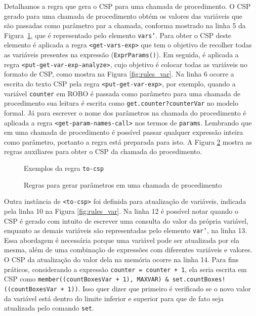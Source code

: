 Detalhamos a regra que gera o CSP para uma chamada de procedimento. O CSP gerado para uma chamada de procedimento 
obtém os valores das variáveis que são passadas como parâmetro par a chamada, conforma mostrado na linha 5 da Figura~\ref{fig:to_csp}, que é representado pelo elemento \texttt{vars'}. Para obter o CSP deste elemento é aplicada a regra \texttt{<get-vars-exp>} que tem o objetivo de recolher todas as variáveis presentes na expressão (\texttt{ExprParams()}). Em seguida, é aplicada a regra \texttt{<put-get-var-exp-analyze>}, cujo objetivo é colocar todas as variáveis no formato de CSP, como mostra na Figura \ref{fig:rules_var}. Na linha 6 ocorre a escrita do texto CSP pela regra \texttt{<put-get-var-exp>}, por exemplo, quando a variável \texttt{counter} em ROBO é passada como parâmetro para uma chamada de procedimento sua leitura é escrita como \texttt{get.counter?counterVar} no modelo formal. Já para escrever o nome dos parâmetros na chamada do procedimento é aplicada a regra  \texttt{<get-param-names-call>} nos termos de \texttt{params}. Lembrando que em uma chamada de procedimento é possível passar qualquer expressão inteira como parâmetro, portanto a regra está preparada para isto. A Figura \ref{fig:rules_param} mostra as regras auxiliares para obter o CSP da chamada do procedimento.

\begin{figure}[!h]
\centering
\caption{Exemplos da regra \texttt{to-csp}}

\label{fig:to_csp}
\end{figure}

\begin{figure}[!h]
\centering
\caption{Regras para gerar parâmetros em uma chamada de procedimento}

\label{fig:rules_param}
\end{figure}


Outra instância de \texttt{<to-csp>} foi definida para atualização de variáveis, indicada pela linha 10 na Figura \ref{fig:rules_var}. Na linha 12 é possível notar quando o CSP é gerado com intuito de escrever uma consulta do valor da própria variável, enquanto as demais variáveis são representadas pelo elemento \texttt{var'}, na linha 13. Essa abordagem é necessária porque uma variável pode ser atualizada por ela mesma, além de uma combinação de expressões com diferentes variáveis e valores. O CSP da atualização do valor dela na memória ocorre na linha 14. Para fins práticos, considerando a expressão \texttt{counter = counter + 1}, ela seria escrita em CSP como \texttt{member((countBoxesVar + 1), MAXVAR) \& set.countBoxes!((countBoxesVar + 1))}. Isso quer dizer que primeiro é verificado se o novo valor da variável está dentro do limite inferior e superior para que de fato seja atualizada pelo comando \texttt{set}.

